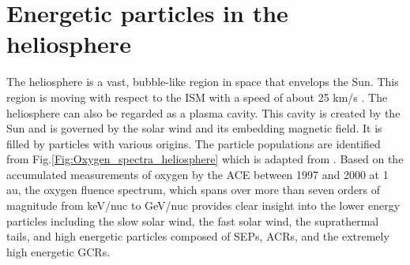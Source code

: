 \section{Energetic particles in the heliosphere}
\label{sec:particles_heliosphere}


The heliosphere is a vast, bubble-like region in space that envelops the Sun. This region is moving with respect to the \ac{ISM} with a speed of about 25 km/s \citep{McComas2015ApJS}. The heliosphere can also be regarded as a plasma cavity. This cavity is created by the Sun and is governed by the solar wind and its embedding magnetic field. It is filled by particles with various origins. The particle populations are identified from Fig.\ref{Fig:Oxygen_spectra_heliosphere} which is adapted from \citet{Mewaldt-2001}. Based on the accumulated measurements of oxygen by the \ac{ACE} between 1997 and 2000 at 1 au, the oxygen fluence spectrum, which spans over more than seven orders of magnitude from keV/nuc to GeV/nuc provides clear insight into the lower energy particles including the slow solar wind, the fast solar wind, the suprathermal tails, and high energetic particles composed of \acp{SEP}, \acp{ACR}, and the extremely high energetic \acp{GCR}. 


